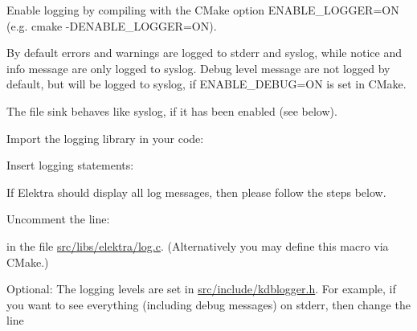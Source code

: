 Enable logging by compiling with the C\+Make option {\ttfamily E\+N\+A\+B\+L\+E\+\_\+\+L\+O\+G\+G\+ER=ON} (e.\+g. {\ttfamily cmake -\/D\+E\+N\+A\+B\+L\+E\+\_\+\+L\+O\+G\+G\+ER=ON}).

By default errors and warnings are logged to stderr and syslog, while notice and info message are only logged to syslog. Debug level message are not logged by default, but will be logged to syslog, if {\ttfamily E\+N\+A\+B\+L\+E\+\_\+\+D\+E\+B\+UG=ON} is set in C\+Make.

The file sink behaves like syslog, if it has been enabled (see below).


\begin{DoxyEnumerate}
\item Import the logging library in your code\+:
\end{DoxyEnumerate}


\begin{DoxyCode}{0}
\end{DoxyCode}



\begin{DoxyEnumerate}
\item Insert logging statements\+:
\end{DoxyEnumerate}


\begin{DoxyCode}{0}
\end{DoxyCode}


If Elektra should display all log messages, then please follow the steps below.


\begin{DoxyEnumerate}
\item Uncomment the line\+:
\end{DoxyEnumerate}


\begin{DoxyCode}{0}
\DoxyCodeLine{\textcolor{comment}{// \#define NO\_FILTER}}
\end{DoxyCode}


in the file {\ttfamily \mbox{\hyperlink{log_8c}{src/libs/elektra/log.\+c}}}. (Alternatively you may define this macro via C\+Make.)


\begin{DoxyEnumerate}
\item Optional\+: The logging levels are set in {\ttfamily \mbox{\hyperlink{kdblogger_8h}{src/include/kdblogger.\+h}}}. For example, if you want to see everything (including debug messages) on stderr, then change the line
\end{DoxyEnumerate}


